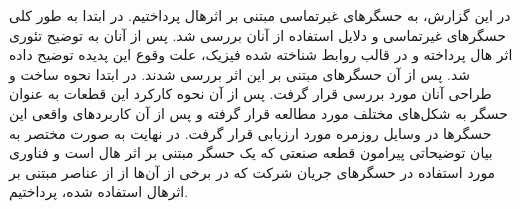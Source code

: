 


در این گزارش، به حسگر‌های غیرتماسی مبتنی بر اثرهال پرداختیم. در ابتدا به طور کلی حسگرهای غیرتماسی و دلایل استفاده از آنان بررسی شد. پس از آنان به توضیح تئوری اثر هال پرداخته و در قالب روابط شناخته شده فیزیک، علت وقوع این پدیده توضیح داده شد.  پس از آن حسگرهای مبتنی بر این اثر بررسی شدند. در ابتدا نحوه ساخت و طراحی آنان مورد بررسی قرار گرفت.  پس از آن نحوه کارکرد این قطعات به عنوان حسگر به شکل‌های مختلف مورد مطالعه قرار گرفته و پس از آن کاربردهای واقعی این حسگرها در وسایل روزمره مورد ارزیابی قرار گرفت. در نهایت به صورت مختصر به بیان توضیحاتی پیرامون قطعه صنعتی   که یک حسگر مبتنی بر اثر هال است و فناوری مورد استفاده در حسگر‌های جریان شرکت  که در برخی از آن‌ها از از عناصر مبتنی بر اثر‌هال استفاده شده، پرداختیم.
